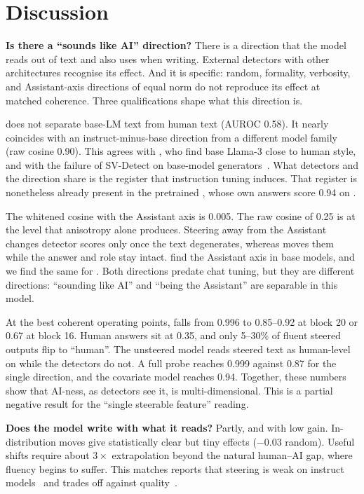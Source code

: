\section{Discussion}
\label{sec:discussion}

{\bf Is there a ``sounds like AI'' direction?} There is a direction that the model reads out of text and also uses when writing. External detectors with other architectures recognise its effect. And it is specific: random, formality, verbosity, and Assistant-axis directions of equal norm do not reproduce its effect at matched coherence. Three qualifications shape what this direction is.

 \dai does not separate base-LM text from human text (AUROC 0.58). It nearly coincides with an instruct-minus-base direction from a different model family (raw cosine 0.90). This agrees with \citet{reinhart2024hape}, who find base Llama-3 close to human style, and with the failure of SV-Detect on base-model generators~\citep{vishnyakov2026svdetect}. What detectors and the direction share is the register that instruction tuning induces. That register is nonetheless already present in the pretrained \qwenbase, whose own answers score 0.94 on \desklib.

 The whitened cosine with the Assistant axis is 0.005. The raw cosine of 0.25 is at the level that anisotropy alone produces. Steering away from the Assistant changes detector scores only once the text degenerates, whereas \dai moves them while the answer and role stay intact. \citet{lu2026assistant} find the Assistant axis in base models, and we find the same for \dai. Both directions predate chat tuning, but they are different directions: ``sounding like AI'' and ``being the Assistant'' are separable in this model.

 At the best coherent operating points, \desklib falls from 0.996 to 0.85--0.92 at block 20 or 0.67 at block 16. Human answers sit at 0.35, and only 5--30\% of fluent steered outputs flip to ``human''. The unsteered model reads steered text as human-level on \dai while the detectors do not. A full probe reaches 0.999 against 0.87 for the single direction, and the covariate model reaches 0.94. Together, these numbers show that AI-ness, as detectors see it, is multi-dimensional. This is a partial negative result for the ``single steerable feature'' reading.

{\bf Does the model write with what it reads?} Partly, and with low gain. In-distribution moves give statistically clear but tiny effects (\desklib $-0.03$ \versus random). Useful shifts require about $3\times$ extrapolation beyond the natural human--AI gap, where fluency begins to suffer. This matches reports that steering is weak on instruct models~\citep{steerweak2026} and trades off against quality~\citep{wu2025axbench}.

